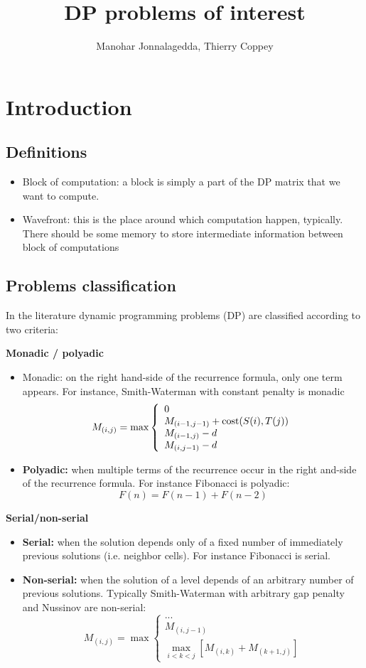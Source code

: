 \documentclass[11pt]{article}
\title{DP problems of interest}
\author{Manohar Jonnalagedda, Thierry Coppey}
\date{}
\def\ul{\begin{itemize}}
\def\ule{\end{itemize}}
\begin{document}
\maketitle
\pagestyle{headings}

\section{Introduction}
\subsection{Definitions}\ul
\item Block of computation: a block is simply a part of the DP matrix that we want to compute.
\item Wavefront: this is the place around which computation happen, typically. There should be some memory to store intermediate information between block of computations
\ule

\subsection{Problems classification}
In the literature dynamic programming problems (DP) are classified according to two criteria:

\textbf{Monadic / polyadic}\ul
\item Monadic: on the right hand-side of the recurrence formula, only one term appears. For instance, Smith-Waterman with constant penalty is monadic
	\[M_{(i,j)}=\max\left\{\begin{array}{l} 0 \\ M_{(i-1,j-1)}+{\rm cost}(S(i),T(j))\\ M_{(i-1,j)}-d\\ M_{(i,j-1)}-d \end{array}\right. \]
\item \textbf{Polyadic:} when multiple terms of the recurrence occur in the right and-side of the recurrence formula. For instance Fibonacci is polyadic: \[F(n) = F(n-1) + F(n-2)\]
\ule

\textbf{Serial/non-serial} \ul
\item \textbf{Serial:} when the solution depends only of a fixed number of immediately previous solutions (i.e. neighbor cells). For instance Fibonacci is serial.
\item \textbf{Non-serial:} when the solution of a level depends of an arbitrary number of previous solutions. Typically Smith-Waterman with arbitrary gap penalty and Nussinov are non-serial:
	\[M_{(i,j)}=\max\left\{\begin{array}{l} ... \\ M_{(i,j-1)}\\ \max\limits_{i<k<j} [ M_{(i,k)}+M_{(k+1,j)} ] \end{array}\right. \]
\ule
\end{document}

